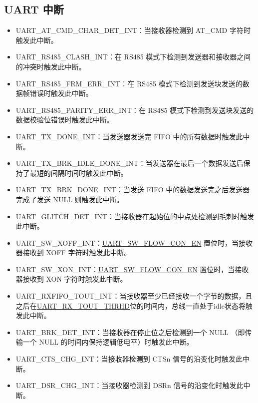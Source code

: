 \documentclass[main\_\_CN.tex]{subfiles}
\begin{document}
\subsection{UART 中断}
\begin{itemize}
\item \label{int:UARTATCMDCHARDETINT}UART\_AT\_CMD\_CHAR\_DET\_INT：当接收器检测到 AT\_CMD 字符时触发此中断。
\item \label{int:UARTRS485CLASHINT}UART\_RS485\_CLASH\_INT：在 RS485 模式下检测到发送器和接收器之间的冲突时触发此中断。
\item \label{int:UARTRS485FRMERRINT}UART\_RS485\_FRM\_ERR\_INT：在 RS485 模式下检测到发送块发送的数据帧错误时触发此中断。
\item \label{int:UARTRS485PARITYERRINT}UART\_RS485\_PARITY\_ERR\_INT：在 RS485 模式下检测到发送块发送的数据校验位错误时触发此中断。
\item \label{int:UARTTXDONEINT}UART\_TX\_DONE\_INT：当发送器发送完 FIFO 中的所有数据时触发此中断。
\item \label{int:UARTTXBRKIDLEDONEINT}UART\_TX\_BRK\_IDLE\_DONE\_INT：当发送器在最后一个数据发送后保持了最短的间隔时间时触发此中断。
\item \label{int:UARTTXBRKDONEINT}UART\_TX\_BRK\_DONE\_INT：当发送 FIFO 中的数据发送完之后发送器完成了发送 NULL 则触发此中断。
\item \label{int:UARTGLITCHDETINT}UART\_GLITCH\_DET\_INT：当接收器在起始位的中点处检测到毛刺时触发此中断。
\item \label{int:UARTSWXOFFINT}UART\_SW\_XOFF\_INT：\hyperref[fielddesc:UARTSWFLOWCONEN]{UART\_SW\_FLOW\_CON\_EN} 置位时，当接收器接收到 XOFF 字符时触发此中断。
\item \label{int:UARTSWXONINT}UART\_SW\_XON\_INT：\hyperref[fielddesc:UARTSWFLOWCONEN]{UART\_SW\_FLOW\_CON\_EN} 置位时，当接收器接收到 XON 字符时触发此中断。
\item \label{int:UARTRXFIFOTOUTINT}UART\_RXFIFO\_TOUT\_INT：当接收器至少已经接收一个字节的数据，且之后在\hyperref[fielddesc:UARTRXTOUTTHRHD]{UART\_RX\_TOUT\_THRHD}位的时间内，总线一直处于idle状态将触发此中断。
\item \label{int:UARTBRKDETINT}UART\_BRK\_DET\_INT：当接收器在停止位之后检测到一个 NULL （即传输一个 NULL 的时间内保持逻辑低电平）时触发此中断。
\item \label{int:UARTCTSCHGINT}UART\_CTS\_CHG\_INT：当接收器检测到 CTSn 信号的沿变化时触发此中断。
\item \label{int:UARTDSRCHGINT}UART\_DSR\_CHG\_INT：当接收器检测到 DSRn 信号的沿变化时触发此中断。

\end{itemize}
\end{document}
